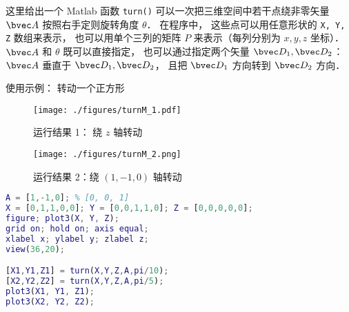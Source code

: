 

这里给出一个 Matlab 函数 \verb|turn()| 可以一次把三维空间中若干点绕非零矢量 $\bvec A$ 按照右手定则旋转角度 $\theta$． 在程序中， 这些点可以用任意形状的 \verb|X, Y, Z| 数组来表示， 也可以用单个三列的矩阵 $P$ 来表示（每列分别为 $x, y, z$ 坐标）． $\bvec A$ 和 $\theta$ 既可以直接指定， 也可以通过指定两个矢量 $\bvec D_1, \bvec D_2$： $\bvec A$ 垂直于 $\bvec D_1, \bvec D_2$， 且把 $\bvec D_1$ 方向转到 $\bvec D_2$ 方向．

使用示例： 转动一个正方形
\begin{figure}[ht]
\centering
\texttt{[image: ./figures/turnM\_1.pdf]}
\caption{运行结果 1： 绕 $z$ 轴转动} \label{turnM_fig1}
\end{figure}
\begin{figure}[ht]
\centering
\texttt{[image: ./figures/turnM\_2.png]}
\caption{运行结果 2：绕 $(1,-1,0)$ 轴转动} \label{turnM_fig2}
\end{figure}

\begin{lstlisting}[language=matlab]
% turn_demo
A = [1,-1,0]; % [0, 0, 1]
X = [0,1,1,0,0]; Y = [0,0,1,1,0]; Z = [0,0,0,0,0];
figure; plot3(X, Y, Z);
grid on; hold on; axis equal;
xlabel x; ylabel y; zlabel z;
view(36,20);

[X1,Y1,Z1] = turn(X,Y,Z,A,pi/10);
[X2,Y2,Z2] = turn(X,Y,Z,A,pi/5);
plot3(X1, Y1, Z1);
plot3(X2, Y2, Z2);
\end{lstlisting}

